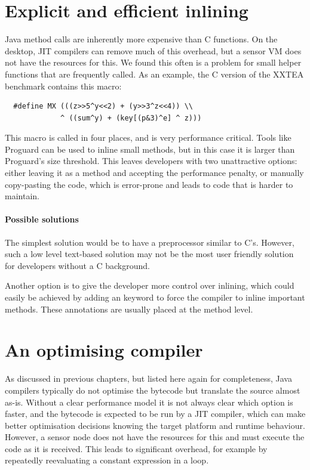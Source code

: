 \section{Explicit and efficient inlining}
\label{sec-inlining}
Java method calls are inherently more expensive than C functions. On the desktop, JIT compilers can remove much of this overhead, but a sensor VM does not have the resources for this. We found this often is a problem for small helper functions that are frequently called. As an example, the C version of the XXTEA benchmark contains this macro: 

\begin{verbatim}
  #define MX (((z>>5^y<<2) + (y>>3^z<<4)) \\
             ^ ((sum^y) + (key[(p&3)^e] ^ z)))
\end{verbatim}

This macro is called in four places, and is very performance critical. Tools like Proguard \cite{proguard} can be used to inline small methods, but in this case it is larger than Proguard's size threshold. This leaves developers with two unattractive options: either leaving it as a method and accepting the performance penalty, or manually copy-pasting the code, which is error-prone and leads to code that is harder to maintain.

\paragraph{Possible solutions}
The simplest solution would be to have a preprocessor similar to C's. However, such a low level text-based solution may not be the most user friendly solution for developers without a C background.

Another option is to give the developer more control over inlining, which could easily be achieved by adding an  keyword to force the compiler to inline important methods. These annotations are usually placed at the method level.




\section{An optimising compiler}
\label{sec-optimising-javac}
As discussed in previous chapters, but listed here again for completeness, Java compilers typically do not optimise the bytecode but translate the source almost as-is. Without a clear performance model it is not always clear which option is faster, and the bytecode is expected to be run by a JIT compiler, which can make better optimisation decisions knowing the target platform and runtime behaviour. However, a sensor node does not have the resources for this and must execute the code as it is received. This leads to significant overhead, for example by repeatedly reevaluating a constant expression in a loop.


